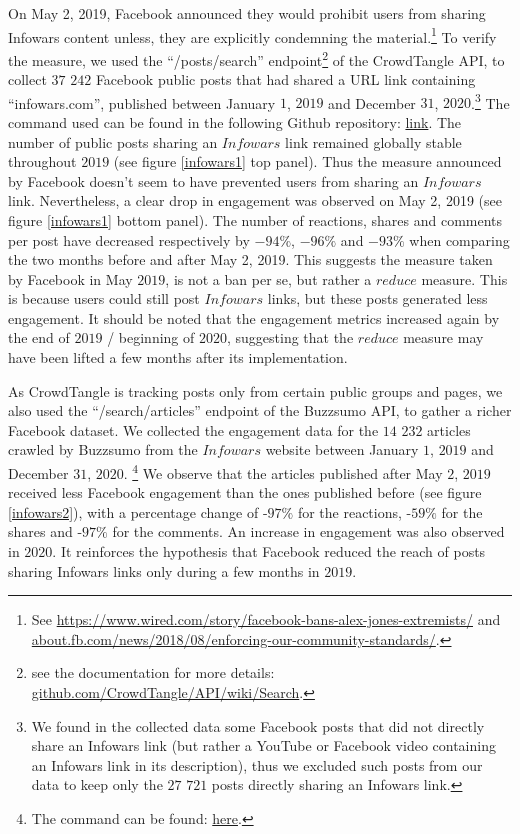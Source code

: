\documentclass{article}
\begin{document}
On May 2, 2019, Facebook announced they would prohibit users from sharing Infowars content unless, they are explicitly condemning the material.\footnote{See \href{https://www.wired.com/story/facebook-bans-alex-jones-extremists/}{https://www.wired.com/story/facebook-bans-alex-jones-extremists/} and \href{https://about.fb.com/news/2018/08/enforcing-our-community-standards/}{about.fb.com/news/2018/08/enforcing-our-community-standards/}.} To verify the measure, we used the ``/posts/search'' endpoint\footnote{see the documentation for more details: \href{https://github.com/CrowdTangle/API/wiki/Search}{github.com/CrowdTangle/API/wiki/Search}.} of the CrowdTangle API, to collect $37$ $242$ Facebook public posts that had shared a URL link containing ``infowars.com'', published between January $1$, $2019$ and December $31$, $2020$.\footnote{We found in the collected data some Facebook posts that did not directly share an Infowars link (but rather a YouTube or Facebook video containing an Infowars link in its description), thus we excluded such posts from our data to keep only the $27$ $721$ posts directly sharing an Infowars link.} The command used can be found in the following Github repository: \href{https://github.com/medialab/truth-and-trust-online-2021/blob/master/code/collect_facebook_crowdtangle_infowars_data.sh}{link}. The number of public posts sharing an $Infowars$ link remained globally stable throughout $2019$ (see figure \ref{infowars1} top panel). Thus the measure announced by Facebook doesn't seem to have prevented users from sharing an $Infowars$ link. Nevertheless, a clear drop in engagement was observed on May 2, 2019 (see figure \ref{infowars1} bottom panel). The number of reactions, shares and comments per post have decreased respectively  by $-94\%$,  $-96\%$ and $-93\%$  when comparing the two months before and after May 2, 2019. This suggests the measure taken by Facebook in May $2019$, is not a ban per se, but rather a $reduce$ measure. This is because users could still post $Infowars$ links, but these posts generated less engagement. It should be noted that the engagement metrics increased again by the end of $2019$ / beginning of $2020$, suggesting that the $reduce$ measure may have been lifted a few months after its implementation.

As CrowdTangle is tracking posts only from certain public groups and pages, we also used the ``/search/articles'' endpoint of the Buzzsumo API, to gather a richer Facebook dataset. We collected the engagement data for the $14$ $232$ articles crawled by Buzzsumo from the $Infowars$ website between January $1$, $2019$ and December $31$, $2020$.  \footnote{The command can be found: \href{https://github.com/medialab/truth-and-trust-online-2021/blob/master/code/collect\_facebook\_buzzsumo\_infowars\_data.py}{here}.} We observe that the articles published after May $2$, $2019$ received less Facebook engagement than the ones published before (see figure \ref{infowars2}), with a percentage change of -$97\%$ for the reactions, -$59\%$ for the shares and -$97\%$ for the comments. An increase in engagement was also observed in $2020$. It reinforces the hypothesis that Facebook reduced the reach of posts sharing Infowars links only during a few months in $2019$.
\end{document}
